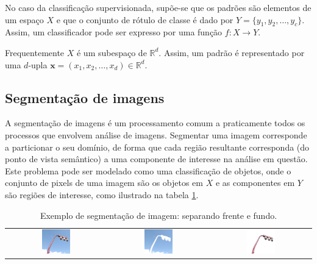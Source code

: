 \documentclass[a4paper,11pt]{article}
\begin{document}
No caso da classificação supervisionada, supõe-se que os padrões são
elementos de um espaço $X$ e que o conjunto de rótulo de classe é dado
por $Y=\{y_1,y_2,\ldots,y_c\}$. Assim, um classificador pode ser
expresso por uma função $f: X \to Y$.

Frequentemente $X$ é um subespaço de $\mathbb{R}^d$. Assim, um padrão
é representado por uma $d$-upla $\mathbf{x}=(x_1,x_2,\ldots,x_d) \in
\mathbb{R}^d$.

\subsection{Segmentação de imagens}

A segmentação de imagens é um processamento comum a praticamente
todos os processos que envolvem análise de imagens. Segmentar uma
imagem corresponde a particionar o seu domínio, de forma que cada
região resultante corresponda (do ponto de vista semântico) a uma
componente de interesse na análise em questão. Este problema pode ser modelado como uma classificação de objetos, onde o conjunto de pixels de uma imagem são os objetos em $X$ e as componentes em $Y$ são regiões de interesse, como ilustrado na tabela \ref{tab:image_segmentation}.

\begin{table}
  \caption{Exemplo de segmentação de imagem: separando frente e fundo.}
  \begin{tabular}[p]{@{}ccc@{}}
    \centering
    \includegraphics[width=0.3\textwidth]{assets/image_segmentation/classification_example.png}
    &
    \includegraphics[width=0.3\textwidth]{assets/image_segmentation/background.png}
    &
    \includegraphics[width=0.3\textwidth]{assets/image_segmentation/foreground.png}
    \label{tab:image_segmentation}
  \end{tabular}
\end{table}
\end{document}
